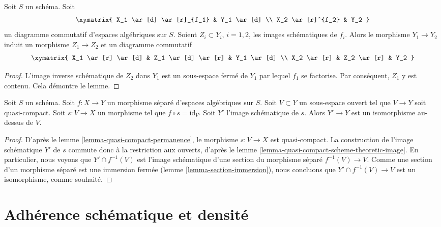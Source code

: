 \begin{lemma}
\label{lemma-factor-factor}
Soit $S$ un schéma. Soit
$$
\xymatrix{
X_1 \ar[d] \ar[r]_{f_1} & Y_1 \ar[d] \\
X_2 \ar[r]^{f_2} & Y_2
}
$$
un diagramme commutatif d'espaces algébriques sur $S$.
Soient $Z_i \subset Y_i$, $i = 1, 2$, les
images schématiques de $f_i$. Alors le morphisme
$Y_1 \to Y_2$ induit un morphisme $Z_1 \to Z_2$ et un
diagramme commutatif
$$
\xymatrix{
X_1 \ar[r] \ar[d] & Z_1 \ar[d] \ar[r] & Y_1 \ar[d] \\
X_2 \ar[r] & Z_2 \ar[r] & Y_2
}
$$
\end{lemma}

\begin{proof}
L'image inverse schématique de $Z_2$ dans $Y_1$
est un sous-espace fermé de $Y_1$ par lequel
$f_1$ se factorise. Par conséquent, $Z_1$ y est contenu.
Cela démontre le lemme.
\end{proof}

\begin{lemma}
\label{lemma-scheme-theoretic-image-of-partial-section}
Soit $S$ un schéma.
Soit $f : X \to Y$ un morphisme séparé d'espaces algébriques sur $S$.
Soit $V \subset Y$ un sous-espace ouvert tel que $V \to Y$ soit quasi-compact.
Soit $s : V \to X$ un morphisme tel que $f \circ s = \text{id}_V$.
Soit $Y'$ l'image schématique de $s$.
Alors $Y' \to Y$ est un isomorphisme au-dessus de $V$.
\end{lemma}

\begin{proof}
D'après le lemme \ref{lemma-quasi-compact-permanence},
le morphisme $s : V \to X$ est quasi-compact.
La construction de l'image schématique $Y'$
de $s$ commute donc à la restriction aux ouverts, d'après le
lemme \ref{lemma-quasi-compact-scheme-theoretic-image}.
En particulier, nous voyons que $Y' \cap f^{-1}(V)$ est
l'image schématique d'une section du morphisme séparé
$f^{-1}(V) \to V$. Comme une section d'un morphisme séparé
est une immersion fermée
(lemme \ref{lemma-section-immersion}),
nous concluons que
$Y' \cap f^{-1}(V) \to V$ est un isomorphisme, comme souhaité.
\end{proof}








\section{Adhérence schématique et densité}
\label{section-scheme-theoretic-closure}

